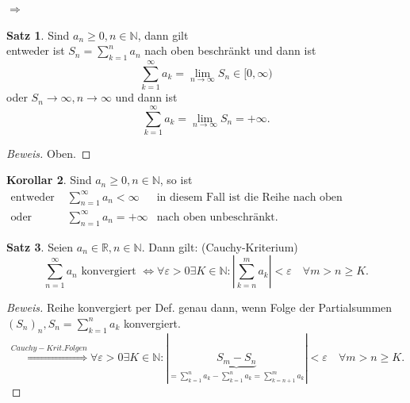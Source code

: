 \documentclass[12pt,a4paper,titlepage]{article} %
\theoremstyle{definition}
\newtheorem{satz}{Satz}[subsection]
\newtheorem{kor}[satz]{Korollar}
\theoremstyle{remark}
\newenvironment{bew}{\begin{proof}[Beweis]}{\end{proof}}
\newcommand{\N}{\mathbb{N}}
\newcommand{\R}{\mathbb{R}}
\newcommand{\limes}[1]{\lim\limits_{#1\rightarrow\infty}}
\begin{document}
\( \Rightarrow \)
\begin{satz}
	Sind \(a_n \geq 0, n\in\N \), dann gilt\\
	entweder ist \(S_n = \sum_{k=1}^{n}a_n\) nach oben beschränkt und dann ist \[ \sum_{k=1}^{\infty}a_k = \limes{n}S_n \in [0,\infty) \]
	oder \(S_n \rightarrow \infty, n\rightarrow\infty \) und dann ist \[ \sum_{k=1}^{\infty}a_k = \limes{n}S_n = +\infty. \]
\end{satz}
\begin{bew}
	Oben.
\end{bew}
\begin{kor}
	Sind \(a_n \geq 0, n\in \N \), so ist
	\begin{align*}
		\text{entweder } &\sum_{n=1}^{\infty}a_n < \infty &\text{in diesem Fall ist die Reihe nach oben beschränkt.}\\
		\text{oder } &\sum_{n=1}^{\infty}a_n = +\infty &\text{nach oben unbeschränkt.}
	\end{align*}
\end{kor}
\begin{satz}
	Seien \(a_n \in\R, n\in\N\). Dann gilt: (Cauchy-Kriterium)
	\[ \sum_{n=1}^{\infty} a_n \text{ konvergiert } \Leftrightarrow \forall \varepsilon >0 \exists K \in \N : | \sum_{k=n}^{m}a_k|<\varepsilon \quad \forall m>n\geq K.\]
\end{satz}
\begin{bew}
	Reihe konvergiert per Def. genau dann, wenn Folge der Partialsummen \( (S_n)_n, S_n = \sum_{k=1}^{n}a_k \) konvergiert.
	\[ \overset{Cauchy-Krit. Folgen}{\Longleftrightarrow} \forall \varepsilon > 0 \exists K\in\N: |\underbrace{S_m-S_n}_{=\sum_{k=1}^{n}a_k-\sum_{k=1}^{n}a_k=\sum_{k=n+1}^{m}a_k}|<\varepsilon \quad \forall m>n\geq K. \]
\end{bew}
\end{document}

